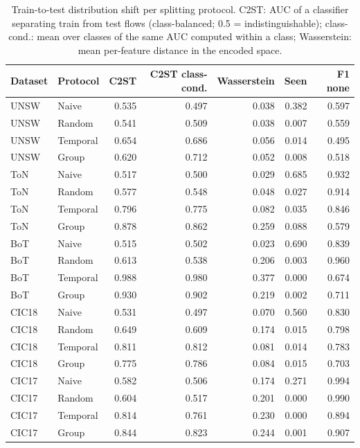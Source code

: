 \begin{table}[t]
\centering\small
\caption{Train-to-test distribution shift per splitting protocol. C2ST: AUC of a classifier separating train from test flows (class-balanced; 0.5 = indistinguishable); class-cond.: mean over classes of the same AUC computed within a class; Wasserstein: mean per-feature distance in the encoded space.}
\label{tab:shift}
\begin{tabular}{llrrrrr}
\toprule
Dataset & Protocol & C2ST & C2ST class-cond. & Wasserstein & Seen & F1 none \\
\midrule
UNSW & Naive & 0.535 & 0.497 & 0.038 & 0.382 & 0.597 \\
UNSW & Random & 0.541 & 0.509 & 0.038 & 0.007 & 0.559 \\
UNSW & Temporal & 0.654 & 0.686 & 0.056 & 0.014 & 0.495 \\
UNSW & Group & 0.620 & 0.712 & 0.052 & 0.008 & 0.518 \\
ToN & Naive & 0.517 & 0.500 & 0.029 & 0.685 & 0.932 \\
ToN & Random & 0.577 & 0.548 & 0.048 & 0.027 & 0.914 \\
ToN & Temporal & 0.796 & 0.775 & 0.082 & 0.035 & 0.846 \\
ToN & Group & 0.878 & 0.862 & 0.259 & 0.088 & 0.579 \\
BoT & Naive & 0.515 & 0.502 & 0.023 & 0.690 & 0.839 \\
BoT & Random & 0.613 & 0.538 & 0.206 & 0.003 & 0.960 \\
BoT & Temporal & 0.988 & 0.980 & 0.377 & 0.000 & 0.674 \\
BoT & Group & 0.930 & 0.902 & 0.219 & 0.002 & 0.711 \\
CIC18 & Naive & 0.531 & 0.497 & 0.070 & 0.560 & 0.830 \\
CIC18 & Random & 0.649 & 0.609 & 0.174 & 0.015 & 0.798 \\
CIC18 & Temporal & 0.811 & 0.812 & 0.081 & 0.014 & 0.783 \\
CIC18 & Group & 0.775 & 0.786 & 0.084 & 0.015 & 0.703 \\
CIC17 & Naive & 0.582 & 0.506 & 0.174 & 0.271 & 0.994 \\
CIC17 & Random & 0.604 & 0.517 & 0.201 & 0.000 & 0.990 \\
CIC17 & Temporal & 0.814 & 0.761 & 0.230 & 0.000 & 0.894 \\
CIC17 & Group & 0.844 & 0.823 & 0.244 & 0.001 & 0.907 \\
\bottomrule
\end{tabular}
\end{table}
